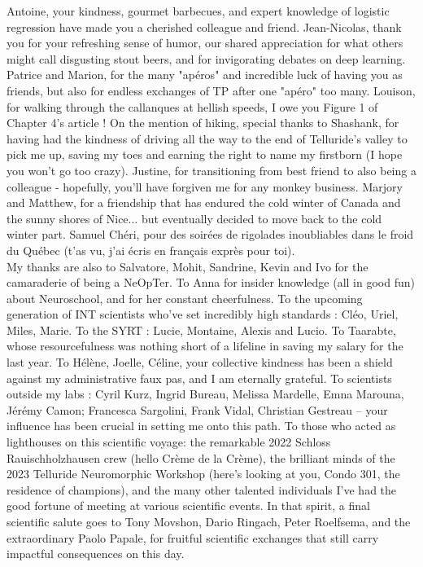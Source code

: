 Antoine, your kindness, gourmet barbecues, and expert knowledge of logistic regression have made you a cherished colleague and friend.
Jean-Nicolas, thank you for your refreshing sense of humor, our shared appreciation for what others might call disgusting stout beers, and for invigorating debates on deep learning.
Patrice and Marion, for the many "apéros" and incredible luck of having you as friends, but also for endless exchanges of TP after one "apéro" too many. Louison, for walking through the callanques at hellish speeds, I owe you Figure 1 of Chapter 4's article ! On the mention of hiking, special thanks to Shashank, for having had the kindness of driving all the way to the end of Telluride's valley to pick me up, saving my toes and earning the right to name my firstborn (I hope you won't go too crazy).
Justine, for transitioning from best friend to also being a colleague - hopefully, you'll have forgiven me for any monkey business.
Marjory and Matthew, for a friendship that has endured the cold winter of Canada and the sunny shores of Nice... but eventually decided to move back to the cold winter part.
Samuel Chéri, pour des soirées de rigolades inoubliables dans le froid du Québec (t'as vu, j'ai écris en français exprès pour toi).\\
My thanks are also to Salvatore, Mohit, Sandrine, Kevin and Ivo for the camaraderie of being a NeOpTer. To Anna for insider knowledge (all in good fun) about Neuroschool, and for her constant cheerfulness. To the upcoming generation of INT scientists who've set incredibly high standards : Cléo, Uriel, Miles, Marie. To the SYRT : Lucie, Montaine, Alexis and Lucio. To Taarabte, whose resourcefulness was nothing short of a lifeline in saving my salary for the last year. To Hélène, Joelle, Céline, your collective kindness has been a shield against my administrative faux pas, and I am eternally grateful.
To scientists outside my labs : Cyril Kurz, Ingrid Bureau, Melissa Mardelle, Emna Marouna, Jérémy Camon; Francesca Sargolini, Frank Vidal, Christian Gestreau – your influence has been crucial in setting me onto this path.
To those who acted as lighthouses on this scientific voyage: the remarkable 2022 Schloss Rauischholzhausen crew (hello Crème de la Crème), the brilliant minds of the 2023 Telluride Neuromorphic Workshop (here's looking at you, Condo 301, the residence of champions), and the many other talented individuals I've had the good fortune of meeting at various scientific events.
In that spirit, a final scientific salute goes to Tony Movshon, Dario Ringach, Peter Roelfsema, and the extraordinary Paolo Papale, for fruitful scientific exchanges that still carry impactful consequences on this day.

